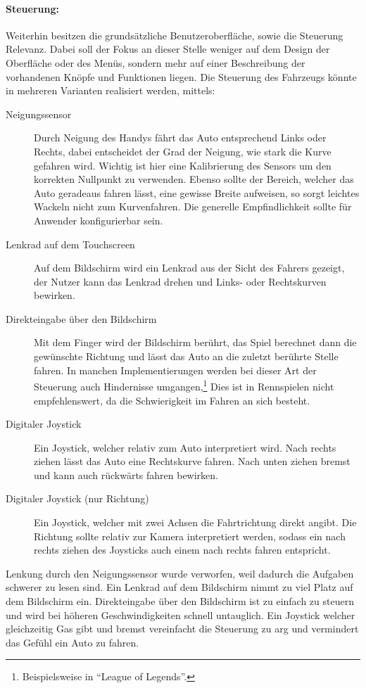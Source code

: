 		\paragraph{Steuerung:}
		Weiterhin besitzen die grundsätzliche Benutzeroberfläche, sowie die Steuerung Relevanz. Dabei soll der Fokus an dieser Stelle weniger auf dem Design der Oberfläche oder des Menüs, sondern mehr auf einer Beschreibung der vorhandenen Knöpfe und Funktionen liegen.
		Die Steuerung des Fahrzeugs könnte in mehreren Varianten realisiert werden, mittels:
		\begin{description}
			\item[Neigungssensor]{ Durch Neigung des Handys fährt das Auto entsprechend Links oder Rechts, dabei entscheidet der Grad der Neigung, wie stark die Kurve gefahren wird. Wichtig ist hier eine Kalibrierung des Sensors um den korrekten Nullpunkt zu verwenden. Ebenso sollte der Bereich, welcher das Auto geradeaus fahren lässt, eine gewisse Breite aufweisen, so sorgt leichtes Wackeln nicht zum Kurvenfahren. Die generelle Empfindlichkeit sollte für Anwender konfigurierbar sein. }
			\item[Lenkrad auf dem Touchscreen]{ Auf dem Bildschirm wird ein Lenkrad aus der Sicht des Fahrers gezeigt, der Nutzer kann das Lenkrad drehen und Links- oder Rechtskurven bewirken. }
			\item[Direkteingabe über den Bildschirm]{ Mit dem Finger wird der Bildschirm berührt, das Spiel berechnet dann die gewünschte Richtung und lässt das Auto an die zuletzt berührte Stelle fahren. In manchen Implementierungen werden bei dieser Art der Steuerung auch Hindernisse umgangen,\footnote{Beispielsweise in \enquote{League of Legends}.} Dies ist in Rennspielen nicht empfehlenswert, da die Schwierigkeit im Fahren an sich besteht.  }
			\item[Digitaler Joystick]{ Ein Joystick, welcher relativ zum Auto interpretiert wird. Nach rechts ziehen lässt das Auto eine Rechtskurve fahren. Nach unten ziehen bremst und kann auch rückwärts fahren bewirken. }
			\item[Digitaler Joystick (nur Richtung)]{ Ein Joystick, welcher mit zwei Achsen die Fahrtrichtung direkt angibt. Die Richtung sollte relativ zur Kamera interpretiert werden, sodass ein nach rechts ziehen des Joysticks auch einem nach rechts fahren entspricht. }
		\end{description}
		Lenkung durch den Neigungssensor wurde verworfen, weil dadurch die Aufgaben schwerer zu lesen sind.
		Ein Lenkrad auf dem Bildschirm nimmt zu viel Platz auf dem Bildschirm ein.
		Direkteingabe über den Bildschirm ist zu einfach zu steuern und wird bei höheren Geschwindigkeiten schnell untauglich.
		Ein Joystick welcher gleichzeitig Gas gibt und bremst vereinfacht die Steuerung zu arg und vermindert das Gefühl ein Auto zu fahren.

